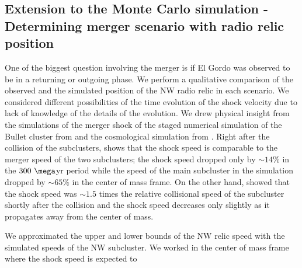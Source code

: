 \subsection{Extension to the Monte Carlo simulation - Determining merger scenario with radio relic position}
\label{sec: positionprior}
%

One of the biggest question involving the merger is if El Gordo was
observed to be in a returning or outgoing phase.
We perform a qualitative comparison of the observed and the
simulated position of the NW radio relic in each scenario.
We considered different possibilities of the time evolution of the shock
velocity due to lack of knowledge of the details of the evolution. We drew physical insight from the simulations of the merger shock of the
staged numerical simulation of the Bullet cluster from \citet{Springel2007}
and the cosmological simulation from \citet{Paul2011b}. Right after
the collision of the subclusters, \citet{Springel2007} shows that the shock speed is
comparable to the merger speed of the two subclusters; the shock speed
dropped only by $\sim 14\%$ in the $300~\mega$yr period while the speed of
the main subcluster in the simulation dropped by $\sim65\%$ in the center
of mass frame. On the other hand, \citet{Paul2011b} showed that the shock
speed was $\sim1.5$ times the relative collisional speed of the subcluster
shortly after the collision and the shock speed decreases only
slightly as it propagates away from the center of mass. \par  
We approximated the upper and lower bounds of the NW relic speed with the
simulated speeds of the NW subcluster.  We worked in the center of mass frame where the shock speed is expected to
